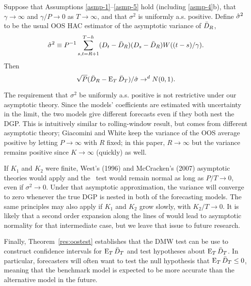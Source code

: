 \documentclass[12pt,draft]{article}
\begin{document}
\begin{thm}\label{res-oost}
  Suppose that Assumptions \ref{asmp-1}--\ref{asmp-5} hold (including
  \ref{asmp-4}b), that $\gamma \to \infty$ and $\gamma/P \to 0$ as $T
  \to \infty$, and that $\sigma^2$ is uniformly a.s. positive. Define
  $\hat{\sigma}^2$ to be the usual OOS HAC estimator of the asymptotic variance
  of $\bar{D}_{R}$,
  \begin{equation}
    \hat{\sigma}^2 \equiv P^{-1} \sum_{s,t=R+1}^{T-h} (D_t - \bar{D}_{R})(D_s - \bar{D}_{R})
    W((t-s)/\gamma).
  \end{equation}
  Then
  \begin{equation}
    \sqrt{P}(\bar{D}_{R} - \operatorname{E}_T\bar{D}_{T})/\hat{\sigma} \to^d N(0,1).
  \end{equation}
\end{thm}

The requirement that $\sigma^2$ be uniformly a.s. positive is not
restrictive under our asymptotic theory. Since the models'
coefficients are estimated with uncertainty in the limit, the two
models give different forecasts even if they both nest the DGP.  This
is intuitively similar to  rolling-window result, but
comes from different asymptotic theory; Giacomini and White keep the
variance of the OOS average positive by letting $P \to \infty$ with
$R$ fixed; in this paper, $R \to \infty$ but the variance remains
positive since $K \to \infty$ (quickly) as well.

If $K_1$ and $K_2$ were finite, West's (1996) and McCracken's (2007)
asymptotic theories would apply and the \oost\ test would remain normal as long
as $P/T \to 0$, even if $\sigma^2 \to 0$. Under that asymptotic
approximation, the variance will converge to zero whenever the true
DGP is nested in both of the forecasting models. The same principles
may also apply if $K_1$ and $K_2$ grow slowly, with $K_2/T \to
0$. It is likely that a second order expansion along the lines of
\citet{Mcc:07} would lead to asymptotic normality for that
intermediate case, but we leave that issue to future research.

Finally, Theorem~\ref{res:oostest} establishes that the DMW test can be
use to construct confidence intervals for $\operatorname{E}_T \bar{D}_{T}$ and test
hypotheses about $\operatorname{E}_T \bar{D}_{T}$. In particular, forecasters will often
want to test the null hypothesis that $\operatorname{E}_T \bar{D}_{T} \leq 0$, meaning
that the benchmark model is expected to be more accurate than the
alternative model in the future.
\end{document}
